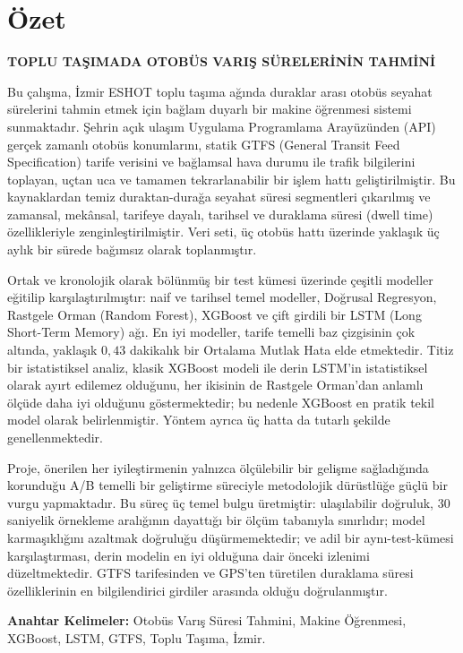 \chapter*{Özet}

\begin{center}
\textbf{TOPLU TAŞIMADA OTOBÜS VARIŞ SÜRELERİNİN TAHMİNİ}
\end{center}

\vspace{0.5cm}

Bu çalışma, İzmir ESHOT toplu taşıma ağında duraklar arası otobüs seyahat sürelerini tahmin etmek için bağlam duyarlı bir makine öğrenmesi sistemi sunmaktadır. Şehrin açık ulaşım Uygulama Programlama Arayüzünden (API) gerçek zamanlı otobüs konumlarını, statik GTFS (General Transit Feed Specification) tarife verisini ve bağlamsal hava durumu ile trafik bilgilerini toplayan, uçtan uca ve tamamen tekrarlanabilir bir işlem hattı geliştirilmiştir. Bu kaynaklardan temiz duraktan-durağa seyahat süresi segmentleri çıkarılmış ve zamansal, mekânsal, tarifeye dayalı, tarihsel ve duraklama süresi (dwell time) özellikleriyle zenginleştirilmiştir. Veri seti, üç otobüs hattı üzerinde yaklaşık üç aylık bir sürede bağımsız olarak toplanmıştır.

Ortak ve kronolojik olarak bölünmüş bir test kümesi üzerinde çeşitli modeller eğitilip karşılaştırılmıştır: naif ve tarihsel temel modeller, Doğrusal Regresyon, Rastgele Orman (Random Forest), XGBoost ve çift girdili bir LSTM (Long Short-Term Memory) ağı. En iyi modeller, tarife temelli baz çizgisinin çok altında, yaklaşık $0{,}43$ dakikalık bir Ortalama Mutlak Hata elde etmektedir. Titiz bir istatistiksel analiz, klasik XGBoost modeli ile derin LSTM'in istatistiksel olarak ayırt edilemez olduğunu, her ikisinin de Rastgele Orman'dan anlamlı ölçüde daha iyi olduğunu göstermektedir; bu nedenle XGBoost en pratik tekil model olarak belirlenmiştir. Yöntem ayrıca üç hatta da tutarlı şekilde genellenmektedir.

Proje, önerilen her iyileştirmenin yalnızca ölçülebilir bir gelişme sağladığında korunduğu A/B temelli bir geliştirme süreciyle metodolojik dürüstlüğe güçlü bir vurgu yapmaktadır. Bu süreç üç temel bulgu üretmiştir: ulaşılabilir doğruluk, 30 saniyelik örnekleme aralığının dayattığı bir ölçüm tabanıyla sınırlıdır; model karmaşıklığını azaltmak doğruluğu düşürmemektedir; ve adil bir aynı-test-kümesi karşılaştırması, derin modelin en iyi olduğuna dair önceki izlenimi düzeltmektedir. GTFS tarifesinden ve GPS'ten türetilen duraklama süresi özelliklerinin en bilgilendirici girdiler arasında olduğu doğrulanmıştır.

\vfill
\textbf{Anahtar Kelimeler:} Otobüs Varış Süresi Tahmini, Makine Öğrenmesi, XGBoost, LSTM, GTFS, Toplu Taşıma, İzmir.
\clearpage
